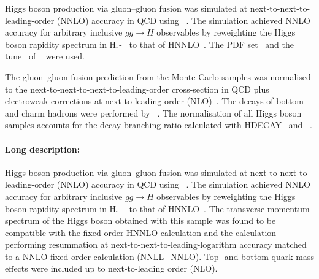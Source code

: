 Higgs boson production via gluon--gluon fusion was simulated at next-to-next-to-leading-order (NNLO) accuracy in
QCD using \POWHEGBOX[v2]~\cite{Hamilton:2013fea,Hamilton:2015nsa,Alioli:2010xd,Nason:2004rx,Frixione:2007vw}.
The simulation achieved NNLO accuracy for arbitrary inclusive \(gg\to H\) observables by reweighting the Higgs boson
rapidity spectrum in \textsc{Hj}-\MINLO~\cite{Hamilton:2012np,Campbell:2012am,Hamilton:2012rf} to that of HNNLO~\cite{Catani:2007vq}.
The \PDFforLHC[15nnlo] PDF set~\cite{Butterworth:2015oua} and the \AZNLO tune~\cite{STDM-2012-23}
of \PYTHIA[8]~\cite{Sjostrand:2014zea} were used.

The gluon--gluon fusion prediction from the Monte Carlo samples was normalised to the
next-to-next-to-next-to-leading-order cross-section in QCD plus electroweak corrections
at next-to-leading order
(NLO)~\cite{deFlorian:2016spz,Anastasiou:2016cez,Anastasiou:2015ema,Dulat:2018rbf,Harlander:2009mq,Harlander:2009bw,Harlander:2009my,Pak:2009dg,Actis:2008ug,Actis:2008ts,Bonetti:2018ukf,Bonetti:2018ukf}. The decays of bottom and charm hadrons
were performed by \EVTGEN~\cite{Lange:2001uf}.
The normalisation of all Higgs boson
samples accounts for the decay branching ratio calculated with HDECAY~\cite{Djouadi:1997yw,Spira:1997dg,Djouadi:2006bz}
and \PROPHECY~\cite{Bredenstein:2006ha,Bredenstein:2006rh,Bredenstein:2006nk}.


\paragraph{Long description:}

Higgs boson production via gluon--gluon fusion was simulated at next-to-next-to-leading-order (NNLO) accuracy in QCD using
\POWHEGBOX[v2]~\cite{Hamilton:2013fea,Hamilton:2015nsa,Alioli:2010xd,Nason:2004rx,Frixione:2007vw}. The simulation achieved NNLO
accuracy for arbitrary inclusive \(gg\to H\) observables by reweighting the Higgs boson rapidity spectrum
in \textsc{Hj}-\MINLO~\cite{Hamilton:2012np,Campbell:2012am,Hamilton:2012rf} to that of HNNLO~\cite{Catani:2007vq}. The transverse momentum
spectrum of the Higgs boson obtained with this sample was found to be compatible with the fixed-order HNNLO calculation and the
\HRES[2.3] calculation~\cite{Bozzi:2005wk,deFlorian:2011xf} performing resummation at next-to-next-to-leading-logarithm accuracy
matched to a NNLO fixed-order calculation (NNLL+NNLO).
Top- and bottom-quark mass effects were included up to next-to-leading order (NLO).

